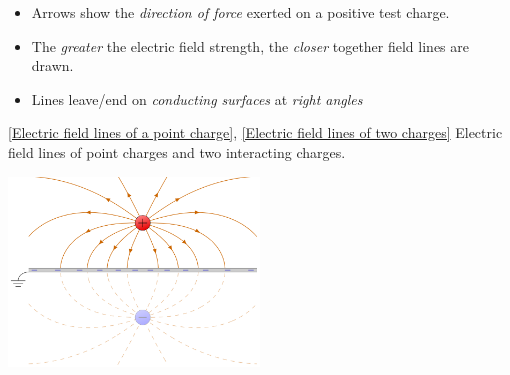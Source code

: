 \documentclass[oneside]{book}
\begin{document}
\begin{itemize}
\begin{itemize}
        \item Arrows show the \emph{direction of force} exerted on a positive test charge.
        \item The \emph{greater} the electric field strength, the \emph{closer} together field lines are drawn.
        \item Lines leave/end on \emph{conducting surfaces} at \emph{right angles}
    \end{itemize}
  \captionsetup{type=figure}
  \caption[figure]{\ref{Electric field lines of a point charge}, \ref{Electric field lines of two charges} Electric field lines of point charges and two interacting charges.}
  \begin{center}
    \includegraphics[width=0.5\textwidth]{../images/E-fieldPlate.png}

\end{center}
\end{itemize}
\end{document}

